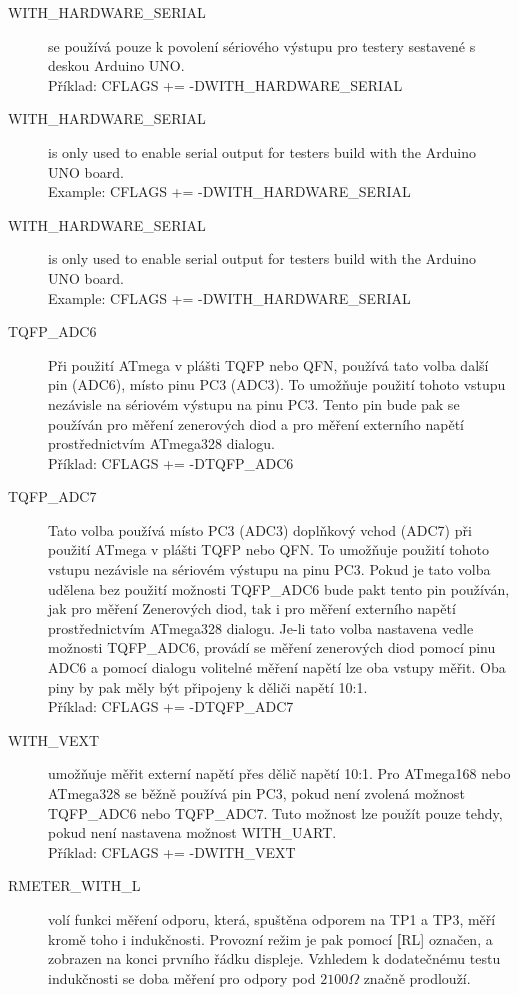 \begin{description}
  \item[WITH\_HARDWARE\_SERIAL] se používá pouze k povolení sériového výstupu pro testery sestavené s deskou Arduino UNO.\\
Příklad:  CFLAGS += -DWITH\_HARDWARE\_SERIAL

  \item[WITH\_HARDWARE\_SERIAL] is only used to enable serial output for testers build with the Arduino UNO board.\\
Example:  CFLAGS += -DWITH\_HARDWARE\_SERIAL
  \item[WITH\_HARDWARE\_SERIAL] is only used to enable serial output for testers build with the Arduino UNO board.\\
Example:  CFLAGS += -DWITH\_HARDWARE\_SERIAL
  \item[TQFP\_ADC6] Při použití ATmega v plášti TQFP nebo QFN, používá tato volba další pin (ADC6),
místo pinu PC3 (ADC3).
To umožňuje použití tohoto vstupu nezávisle na sériovém výstupu na pinu PC3.
Tento pin bude pak se používán pro měření zenerových diod a pro měření externího napětí
prostřednictvím  ATmega328 dialogu.\\
Příklad: CFLAGS += -DTQFP\_ADC6
  \item[TQFP\_ADC7] Tato volba používá místo PC3 (ADC3) doplňkový vchod (ADC7) při použití
ATmega v plášti TQFP nebo QFN.
To umožňuje použití tohoto vstupu nezávisle na sériovém výstupu na pinu PC3.
Pokud je tato volba udělena bez použití možnosti TQFP\_ADC6 bude pakt tento pin používán,
jak pro měření Zenerových diod, tak i pro měření externího napětí prostřednictvím ATmega328 dialogu.
Je-li tato volba nastavena vedle možnosti TQFP\_ADC6, provádí se měření zenerových diod
pomocí pinu ADC6 a  pomocí dialogu volitelné měření napětí lze oba vstupy měřit.
Oba piny by pak měly být připojeny k děliči napětí 10:1.\\
Příklad: CFLAGS += -DTQFP\_ADC7
  \item[WITH\_VEXT]  umožňuje měřit externí napětí přes dělič napětí 10:1.
Pro ATmega168 nebo ATmega328 se běžně používá pin PC3,
pokud není zvolená možnost TQFP\_ADC6 nebo TQFP\_ADC7.
Tuto možnost lze použít pouze tehdy, pokud není nastavena možnost WITH\_UART.\\
Příklad: CFLAGS += -DWITH\_VEXT 
  \item[RMETER\_WITH\_L] volí funkci měření odporu, která, spuštěna odporem na TP1 a TP3,
měří kromě toho i indukčnosti.
Provozní režim je pak pomocí {\textbf[RL]} označen, a zobrazen na konci prvního řádku displeje.
Vzhledem k dodatečnému testu indukčnosti se doba měření pro odpory pod \(2100\Omega\) značně prodlouží.

\end{description}
